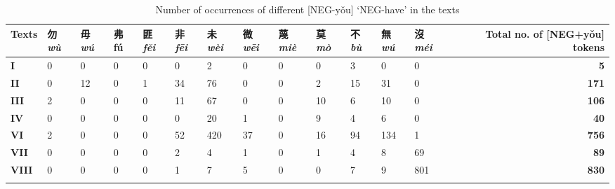 \documentclass[output=paper]{langscibook}
\begin{document}
\begin{sidewaystable}
	\caption{Number of occurrences of different [NEG-yǒu] ‘NEG-have’ in the texts}
	\label{tab:lamB2}
	\begin{tabularx}{\textwidth}{l YYYYYYYYYYYY r}
	\lsptoprule
	\textbf{Texts}
	& {\cn 勿}\newline  \textit{wù}
	& {\cn 毋}\newline  \textit{wú}
	& {\cn 弗}\newline  fú
	& {\cn 匪}\newline  \textit{fěi}
	& {\cn 非}\newline  \textit{fēi}
	& {\cn 未}\newline  \textit{wèi}
	& {\cn 微}\newline  \textit{wēi}
	& {\cn 蔑}\newline  \textit{miè}
	& {\cn 莫}\newline  \textit{mò}
	& {\cn 不}\newline  \textit{bù}
	& {\cn 無}\newline  \textit{wú}
	& {\cn 沒}\newline  \textit{méi}
	& \textbf{Total no. of}  \textbf{{[}NEG+yǒu{]}}  \textbf{tokens} \\
	\midrule
	\textbf{I} & 0 & 0 & 0 & 0 & 0 & 2 & 0 & 0 & 0 & 3 & 0 & 0 & \textbf{5} \\
	\textbf{II} & 0 & 12 & 0 & 1 & 34 & 76 & 0 & 0 & 2 & 15 & 31 & 0 & \textbf{171} \\
	\textbf{III} & 2 & 0 & 0 & 0 & 11 & 67 & 0 & 0 & 10 & 6 & 10 & 0 & \textbf{106} \\
	\textbf{IV} & 0 & 0 & 0 & 0 & 0 & 20 & 1 & 0 & 9 & 4 & 6 & 0 & \textbf{40} \\
	\textbf{VI} & 2 & 0 & 0 & 0 & 52 & 420 & 37 & 0 & 16 & 94 & 134 & 1 & \textbf{756} \\
	\textbf{VII} & 0 & 0 & 0 & 0 & 2 & 4 & 1 & 0 & 1 & 4 & 8 & 69 & \textbf{89} \\
	\textbf{VIII} & 0 & 0 & 0 & 0 & 1 & 7 & 5 & 0 & 0 & 7 & 9 & 801 & \textbf{830} \\
\lspbottomrule
	\end{tabularx}
\end{sidewaystable}

\clearpage
{\sloppy\printbibliography[heading=subbibliography,notkeyword=this]}
\end{document}

